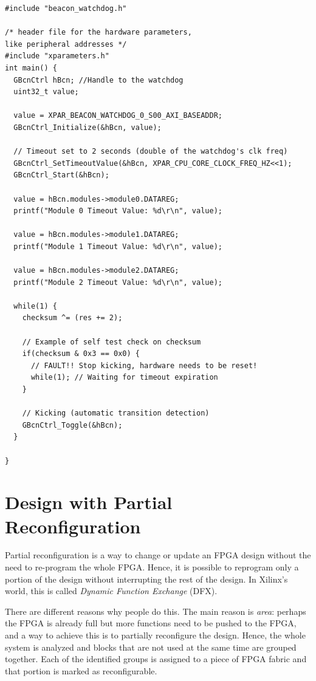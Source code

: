 \newpage
\begin{lstlisting}[style=C]
#include "beacon_watchdog.h"

/* header file for the hardware parameters, 
like peripheral addresses */
#include "xparameters.h" 
int main() {
  GBcnCtrl hBcn; //Handle to the watchdog
  uint32_t value;

  value = XPAR_BEACON_WATCHDOG_0_S00_AXI_BASEADDR;
  GBcnCtrl_Initialize(&hBcn, value);

  // Timeout set to 2 seconds (double of the watchdog's clk freq)
  GBcnCtrl_SetTimeoutValue(&hBcn, XPAR_CPU_CORE_CLOCK_FREQ_HZ<<1);
  GBcnCtrl_Start(&hBcn);

  value = hBcn.modules->module0.DATAREG;
  printf("Module 0 Timeout Value: %d\r\n", value);

  value = hBcn.modules->module1.DATAREG;
  printf("Module 1 Timeout Value: %d\r\n", value);

  value = hBcn.modules->module2.DATAREG;
  printf("Module 2 Timeout Value: %d\r\n", value);

  while(1) {
    checksum ^= (res += 2);

    // Example of self test check on checksum
    if(checksum & 0x3 == 0x0) {
      // FAULT!! Stop kicking, hardware needs to be reset!
      while(1); // Waiting for timeout expiration
    }

    // Kicking (automatic transition detection)
    GBcnCtrl_Toggle(&hBcn); 
  }

}
\end{lstlisting}



\newpage
\section{Design with Partial Reconfiguration}

Partial reconfiguration is a way to change or update an FPGA design without the need to re-program the whole FPGA. Hence, it is possible to reprogram only a portion of the design without interrupting the rest of the design. In Xilinx's world, this is called \textit{Dynamic Function Exchange} (DFX).\bigskip 

There are different reasons why people do this. The main reason is \textit{area}: perhaps the FPGA is already full but more functions need to be pushed to the FPGA, and a way to achieve this is to partially reconfigure the design. Hence, the whole system is analyzed and blocks that are not used at the same time are grouped together. Each of the identified groups is assigned to a piece of FPGA fabric and that portion is marked as reconfigurable. 

